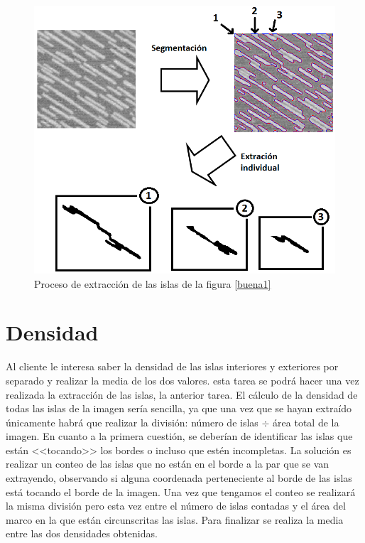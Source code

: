 \begin{figure}[H]
	\captionsetup{justification=centering}
	\centering
	\includegraphics[width=1.1\textwidth]{./imagenes/extraccionIslaBuena}
	\caption{Proceso de extracci\'{o}n de las islas de la figura \ref{buena1} }	
	\label{extraccionIslaBuena}
\end{figure}



\section{Densidad}

Al cliente le interesa saber la densidad de las islas interiores y exteriores por separado y realizar la media de los dos valores. esta tarea se podr\'{a} hacer una vez realizada la extracci\'{o}n de las islas, la anterior tarea. El c\'{a}lculo de la densidad de todas las islas de la imagen ser\'{i}a sencilla, ya que una vez que se hayan extra\'{i}do \'{u}nicamente habr\'{a} que realizar la divisi\'{o}n: n\'{u}mero de islas $\div$ \'{a}rea total de la imagen. En cuanto a la primera cuesti\'{o}n, se deber\'{i}an de identificar las islas que est\'{a}n <<tocando>> los bordes o incluso que est\'{e}n incompletas. La soluci\'{o}n es realizar un conteo de las islas que no est\'{a}n en el borde a la par que se van extrayendo, observando si alguna coordenada perteneciente al borde de las islas est\'{a} tocando el borde de la imagen. Una vez que tengamos el conteo se realizar\'{a} la misma divisi\'{o}n pero esta vez entre el n\'{u}mero de islas contadas y el \'{a}rea del marco en la que est\'{a}n circunscritas las islas. Para finalizar se realiza la media entre las dos densidades obtenidas.

